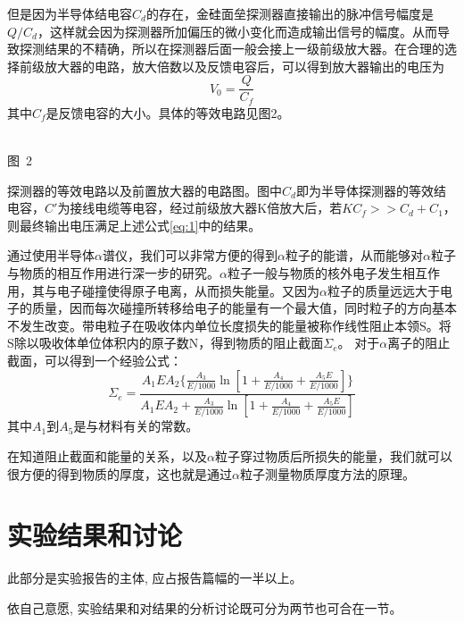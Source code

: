 \documentclass[a4paper,10.0pt,twoside]{npr}
\begin{document}
\begin{multicols}{2}
但是因为半导体结电容$C_d$的存在，金硅面垒探测器直接输出的脉冲信号幅度是$Q/C_d$，这样就会因为探测器所加偏压的微小变化而造成输出信号的幅度。从而导致探测结果的不精确，所以在探测器后面一般会接上一级前级放大器。在合理的选择前级放大器的电路，放大倍数以及反馈电容后，可以得到放大器输出的电压为
\begin{equation}\label{eq:1}
	V_0 =\frac{Q}{C_f}
\end{equation}
其中$C_f$是反馈电容的大小。具体的等效电路见图2。

\begin{center}
   \def\svgwidth{0.4\textwidth}
   
\\
\xiaowu\song 图~2\begin{minipage}[t]{75mm} \quad 探测器的等效电路以及前置放大器的电路图。图中$C_d$即为半导体探测器的等效结电容，$C'$为接线电缆等电容，经过前级放大器K倍放大后，若$KC_f>>C_d+C_1$，则最终输出电压满足上述公式\ref{eq:1}中的结果。\\[-1mm]\wuhao
\end{minipage}
\end{center}

通过使用半导体$\alpha$谱仪，我们可以非常方便的得到$\alpha$粒子的能谱，从而能够对$\alpha$粒子与物质的相互作用进行深一步的研究。$\alpha$粒子一般与物质的核外电子发生相互作用，其与电子碰撞使得原子电离，从而损失能量。又因为$\alpha$粒子的质量远远大于电子的质量，因而每次碰撞所转移给电子的能量有一个最大值，同时粒子的方向基本不发生改变。带电粒子在吸收体内单位长度损失的能量被称作线性阻止本领S。将S除以吸收体单位体积内的原子数N，得到物质的阻止截面$\Sigma_e$。 对于$\alpha$离子的阻止截面，可以得到一个经验公式：
\begin{equation}
	\Sigma_e=\frac{A_1 EA_2 \{ \frac{A_3}{E/1000}\ln[1+\frac{A_4}{E/1000}+\frac{A_5 E}{E/1000}]\}}{A_1 EA_2+\frac{A_3}{E/1000}\ln[1+\frac{A_4}{E/1000}+\frac{A_5 E}{E/1000}]}
\end{equation}
其中$A_1$到$A_5$是与材料有关的常数。

在知道阻止截面和能量的关系，以及$\alpha$粒子穿过物质后所损失的能量，我们就可以很方便的得到物质的厚度，这也就是通过$\alpha$粒子测量物质厚度方法的原理。



\section{实验结果和讨论}
此部分是实验报告的主体, 应占报告篇幅的一半以上。

依自己意愿, 实验结果和对结果的分析讨论既可分为两节也可合在一节。


\end{multicols}
\end{document}
